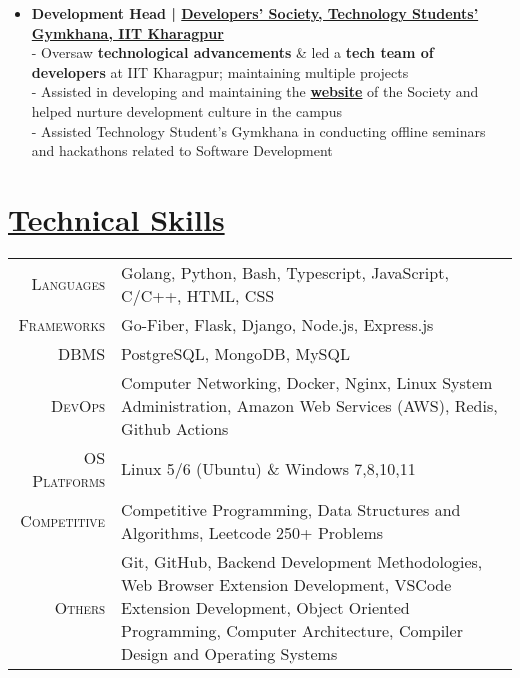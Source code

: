 \documentclass[a4paper,10pt]{extarticle} %
\begin{document}
\begin{itemize}[leftmargin=0.55cm, rightmargin=0.2cm, label={\Large\textbullet}]

\item \textbf{Development Head | \href{https://www.linkedin.com/company/devsoc-iitkgp/posts/?feedView=all}{Developers' Society, Technology Students' Gymkhana, IIT Kharagpur}}\\
- Oversaw \textbf{technological advancements} \& led a \textbf{tech team of developers} at IIT Kharagpur; maintaining multiple projects \\
- Assisted in developing and maintaining the \href{https://www.linkedin.com/company/devsoc-iitkgp/posts/?feedView=all}{\textbf{website}} of the Society and helped nurture development culture in the campus \\
- Assisted Technology Student's Gymkhana in conducting offline seminars and hackathons related to Software Development\\

\end{itemize}

 \vspace{+0.4cm} \section{\textcolor{primary}
 {\href{}{Technical Skills}}}
 \vspace{+0.2cm}

 \begin{tabular}{r|p{15cm}}
 \textsc{Languages} & Golang, Python, Bash, Typescript, JavaScript, C/C++, HTML, CSS\\
 \textsc{Frameworks} & Go-Fiber, Flask, Django, Node.js, Express.js \\
 \textsc{DBMS} & PostgreSQL, MongoDB, MySQL \\
 \textsc{DevOps} & Computer Networking, Docker, Nginx, Linux System Administration, Amazon Web Services (AWS), Redis, Github Actions \\
 \textsc{OS Platforms} & Linux 5/6 (Ubuntu) \& Windows 7,8,10,11 \\
 \textsc{Competitive} & Competitive Programming, Data Structures and Algorithms, Leetcode 250+ Problems \\
 \textsc{Others} & Git, GitHub, Backend Development Methodologies, Web Browser Extension Development, VSCode Extension Development, Object Oriented Programming, Computer Architecture, Compiler Design and Operating Systems \\
 
 
\end{tabular}
\end{document}
